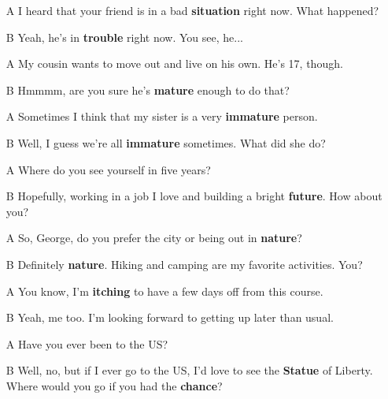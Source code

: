 \begin{itemize}
  \item[A] I heard that your friend is in a bad \textbf{situation} right now. What happened?
  \item[B] Yeah, he's in \textbf{trouble} right now. You see, he... 
\end{itemize}

\begin{itemize}
  \item[A] My cousin wants to move out and live on his own. He's 17, though.
  \item[B] Hmmmm, are you sure he's \textbf{mature} enough to do that?
\end{itemize}

\begin{itemize}
  \item[A] Sometimes I think that my sister is a very \textbf{immature} person.
  \item[B] Well, I guess we're all \textbf{immature} sometimes. What did she do? 
\end{itemize}

\begin{itemize}
  \item[A] Where do you see yourself in five years?
  \item[B] Hopefully, working in a job I love and building a bright \textbf{future}. How about you? 
\end{itemize}

\begin{itemize}
  \item[A] So, George, do you prefer the city or being out in \textbf{nature}?
  \item[B] Definitely \textbf{nature}. Hiking and camping are my favorite activities. You? 
\end{itemize}

\begin{itemize}
  \item[A] You know, I'm \textbf{itching} to have a few days off from this course.
  \item[B] Yeah, me too. I'm looking forward to getting up later than usual. 
\end{itemize}

\begin{itemize}
  \item[A] Have you ever been to the US?
  \item[B] Well, no, but if I ever go to the US, I'd love to see the \textbf{Statue} of Liberty. Where would you go if you had the \textbf{chance}? 
\end{itemize}


\newpage







